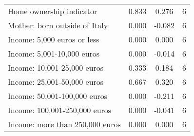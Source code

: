 \begin{table}[htbp]
\begin{tabular}{l*{1}{ccc}}
Home ownership indicator&       0.833         &       0.276&           6\\
Mother: born outside of Italy&       0.000         &      -0.082&           6\\
Income: 5,000 euros or less&       0.000         &       0.000&           6\\
Income: 5,001-10,000 euros&       0.000         &      -0.014&           6\\
Income: 10,001-25,000 euros&       0.333         &       0.184&           6\\
Income: 25,001-50,000 euros&       0.667         &       0.320&           6\\
Income: 50,001-100,000 euros&       0.000         &      -0.211&           6\\
Income: 100,001-250,000 euros&       0.000         &      -0.041&           6\\
Income: more than 250,000 euros&       0.000         &       0.000&           6\\
\bottomrule
\end{tabular}
\end{table}
